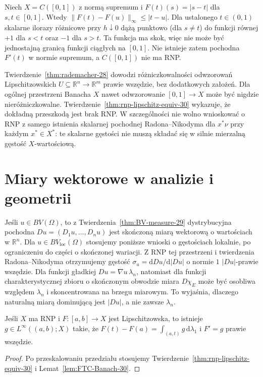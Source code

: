 \begin{przyklad}
Niech $X=C([0,1])$ z normą supremum i
$F(t)(s)=|s-t|$ dla $s,t\in[0,1]$.
Wtedy $\|F(t)-F(u)\|_\infty\le|t-u|$.
Dla ustalonego $t\in(0,1)$ skalarne ilorazy różnicowe
przy $h\downarrow0$ dążą punktowo (dla $s\ne t$)
do funkcji równej $+1$ dla $s<t$ oraz $-1$ dla $s>t$.
Ta funkcja ma skok, więc nie może być jednostajną
granicą funkcji ciągłych na $[0,1]$.
Nie istnieje zatem pochodna $F'(t)$ w normie supremum,
a $C([0,1])$ nie ma RNP.
\end{przyklad}

\begin{uwaga}
Twierdzenie~\ref{thm:rademacher-28} dowodzi
różniczkowalności odwzorowań Lipschitzowskich
$U\subseteq\mathbb R^n\to\mathbb R^m$ prawie
wszędzie, bez dodatkowych założeń. Dla ogólnej
przestrzeni Banacha $X$ nawet odwzorowanie
$[0,1]\to X$ może być nigdzie nieróżniczkowalne.
Twierdzenie~\ref{thm:rnp-lipschitz-equiv-30}
wykazuje, że dokładną przeszkodą jest brak RNP.
W szczególności nie wolno wnioskować o RNP
z samego istnienia skalarnej pochodnej
Radona--Nikodyma dla $x^*\nu$ przy każdym
$x^*\in X^*$: te skalarne gęstości nie muszą
składać się w silnie mierzalną gęstość $X$-wartościową.
\end{uwaga}

\section{Miary wektorowe w analizie i geometrii}
\label{sec:vector-applications-30}
\begin{przyklad}
Jeśli $u\in BV(\Omega)$, to z
Twierdzenia~\ref{thm:BV-measure-29} dystrybucyjna
pochodna $Du=(D_1u,\ldots,D_nu)$ jest skończoną
miarą wektorową o wartościach w $\mathbb R^n$.
Dla $u\in BV_{\mathrm{loc}}(\Omega)$ stosujemy
poniższe wnioski o gęstościach lokalnie, po ograniczeniu
do części o skończonej wariacji.
Z RNP tej przestrzeni i twierdzenia
Radona--Nikodyma otrzymujemy gęstość
$\sigma_u=\mathrm dDu/\mathrm d|Du|$ o normie $1$
$|Du|$-prawie wszędzie. Dla funkcji gładkiej
$Du=\nabla u\,\lambda_n$, natomiast dla funkcji
charakterystycznej zbioru o skończonym obwodzie
miara $D\chi_E$ może być osobliwa względem
$\lambda_n$ i skoncentrowana na brzegu miarowym.
To wyjaśnia, dlaczego naturalną miarą dominującą
jest $|Du|$, a nie zawsze $\lambda_n$.
\end{przyklad}

\begin{wniosek}\label{idx:30:wniosek:15}

Jeśli $X$ ma RNP i $F:[a,b]\to X$ jest
Lipschitzowska, to istnieje $g\in L^\infty((a,b);X)$
takie, że $F(t)-F(a)=\int_{(a,t)}g\,\mathrm d\lambda_1$
i $F'=g$ prawie wszędzie.
\end{wniosek}
\begin{proof}
Po przeskalowaniu przedziału stosujemy
Twierdzenie~\ref{thm:rnp-lipschitz-equiv-30} i
Lemat~\ref{lem:FTC-Banach-30}.
\end{proof}

